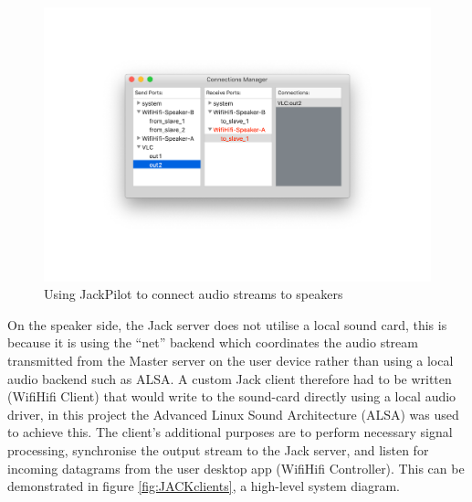 \documentclass[main.tex]{subfiles}
\begin{document}
\begin{figure}[H]
    \centering
    \includegraphics[scale=0.75]{./figs/jackpilot.pdf}        
    \caption{Using JackPilot to connect audio streams to speakers}
    \label{fig:jack-pilot}
\end{figure}

On the speaker side, the Jack server does not utilise a local sound card, this is because it is using the ``net'' backend which coordinates the audio stream transmitted from the Master server on the user device rather than using a local audio backend such as ALSA.
A custom Jack client therefore had to be written (WifiHifi Client) that would write to the sound-card directly using a local audio driver, in this project the Advanced Linux Sound Architecture (ALSA) was used to achieve this.
The client's additional purposes are to perform necessary signal processing, synchronise the output stream to the Jack server, and listen for incoming datagrams from the user desktop app (WifiHifi Controller).
This can be demonstrated in figure \ref{fig:JACKclients}, a high-level system diagram.
\end{document}
